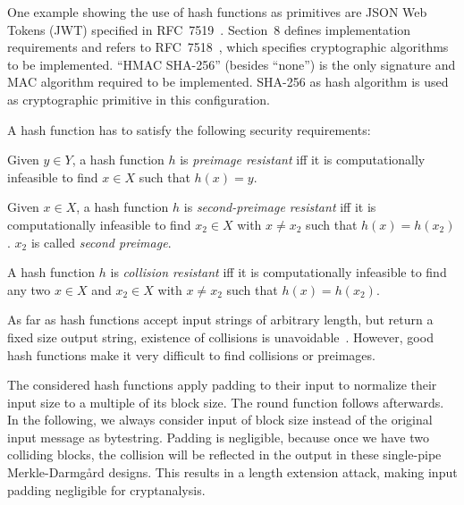 One example showing the use of hash functions as primitives are JSON Web Tokens (JWT)
specified in RFC~7519~\cite{rfc7519}. Section~8 defines implementation requirements
and refers to RFC~7518~\cite{rfc7518}, which specifies cryptographic algorithms to
be implemented. \enquote{HMAC SHA-256} (besides \enquote{none}) is the only signature
and MAC algorithm required to be implemented.
SHA-256 as hash algorithm is used as cryptographic primitive in this configuration.

A hash function has to satisfy the following security requirements:

\begin{defi}
  Given $y \in Y$,
  a hash function $h$ is \emph{preimage resistant} iff it is computationally infeasible
  to find $x \in X$ such that $h(x) = y$.
\end{defi}

\begin{defi}
  Given $x \in X$,
  a hash function $h$ is \emph{second-preimage resistant} iff it is computationally infeasible
  to find $x_2 \in X$ with $x \neq x_2$ such that $h(x) = h(x_2)$.
  $x_2$ is called \emph{second preimage}.
\end{defi}

\begin{defi}
  A hash function $h$ is \emph{collision resistant} iff it is computationally infeasible to
  find any two $x \in X$ and $x_2 \in X$ with $x \neq x_2$ such that $h(x) = h(x_2)$.
\end{defi}

As far as hash functions accept input strings of arbitrary length, but return a fixed
size output string, existence of collisions is unavoidable~\cite{schlaffer}.
However, good hash functions make it very difficult to find collisions or preimages.

The considered hash functions apply padding to their input to normalize their
input size to a multiple of its block size. The round function follows afterwards.
In the following, we always consider input of block size instead of the original
input message as bytestring.
Padding is negligible, because once we have two colliding blocks,
the collision will be reflected in the output in these single-pipe Merkle-Darmg\aa rd designs.
This results in a length extension attack, making input padding negligible for cryptanalysis.

